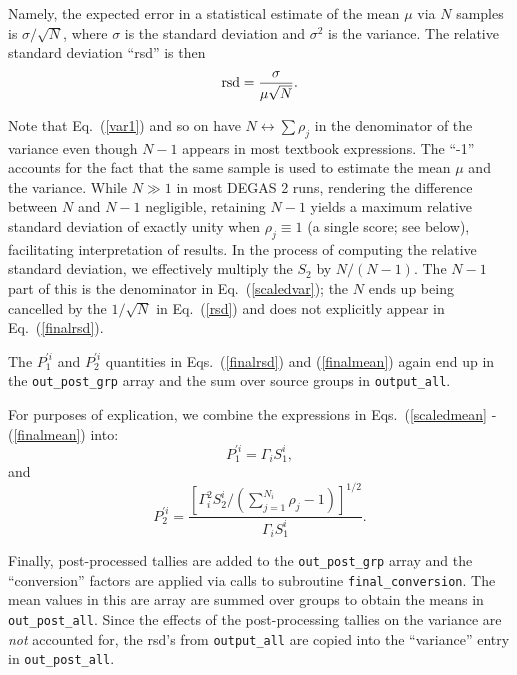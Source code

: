 \documentclass[12pt]{report}
\begin{document}
Namely, the expected
error in a statistical estimate of the mean $\mu$
via $N$ samples is $\sigma / \sqrt{N}$, where
$\sigma$ is the standard deviation and $\sigma^{2}$ 
is the variance.  
The relative standard deviation ``rsd'' is then
\begin{equation}
{\rm rsd} = \frac{\sigma}{\mu \sqrt{N}}.
\label{rsd}
\end{equation}

Note that Eq.~(\ref{var1}) and so on have 
$N \leftrightarrow \sum \rho_{j}$ in the denominator
of the variance even though $N-1$
appears in most textbook expressions.
The ``-1'' accounts for the fact that the 
same sample is used to estimate the mean $\mu$ and the variance.
While $N \gg 1$ in most DEGAS 2 runs, rendering the difference
between $N$ and $N-1$ negligible, retaining $N-1$
yields a maximum relative standard deviation of exactly
unity when $\rho_{j} \equiv 1$
(a single score; see below), facilitating interpretation of 
results.  In the process of computing the relative
standard deviation, we effectively multiply the 
$S_{2}$ by $N/(N-1)$.  The $N-1$ part of this is the denominator
in Eq.~(\ref{scaledvar}); the $N$ ends up being cancelled by the
$1/\sqrt{N}$ in Eq.~(\ref{rsd}) and does not explicitly
appear in Eq.~(\ref{finalrsd}).

The $P^{\prime i}_{1}$ and $P^{\prime i}_{2}$ quantities in 
Eqs.~(\ref{finalrsd}) and (\ref{finalmean}) again end up
in the {\tt out\_post\_grp} array and the sum over source
groups in {\tt output\_all}.

For purposes of explication, we combine the expressions in
Eqs.~(\ref{scaledmean} - (\ref{finalmean}) into:
\begin{equation}
P_{1}^{\prime i} = \Gamma_{i} S_{1}^{i},
\label{finalmean}
\end{equation}
and
\begin{equation}
P_{2}^{\prime i} = \frac{ \left[ \Gamma_{i}^{2} S_{2}^{i} 
/ \left( \sum_{j = 1}^{N_{i}} \rho_{j} - 1 \right) \right]^{1/2}}
{\Gamma_{i} S_{1}^{i}}.
\label{finalrsd}
\end{equation}

Finally, post-processed tallies are added to 
the {\tt out\_post\_grp} array and the ``conversion''
factors are applied via calls to subroutine
{\tt final\_conversion}.  The mean values 
in this are array are summed over
groups to obtain the means in {\tt out\_post\_all}.
Since the effects of the post-processing tallies
on the variance are {\em not} accounted for, 
the rsd's from {\tt output\_all} are copied into the
``variance'' entry in {\tt out\_post\_all}.
\end{document}
